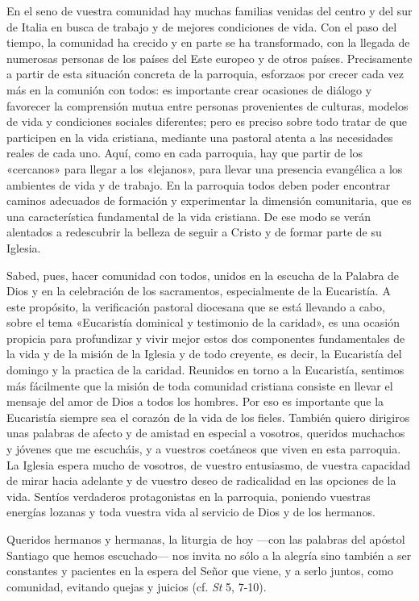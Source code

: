En el seno de vuestra comunidad hay muchas familias venidas del centro y
del sur de Italia en busca de trabajo y de mejores condiciones de vida.
Con el paso del tiempo, la comunidad ha crecido y en parte se ha
transformado, con la llegada de numerosas personas de los países del
Este europeo y de otros países. Precisamente a partir de esta situación
concreta de la parroquia, esforzaos por crecer cada vez más en la
comunión con todos: es importante crear ocasiones de diálogo y favorecer
la comprensión mutua entre personas provenientes de culturas, modelos de
vida y condiciones sociales diferentes; pero es preciso sobre todo
tratar de que participen en la vida cristiana, mediante una pastoral
atenta a las necesidades reales de cada uno. Aquí, como en cada
parroquia, hay que partir de los «cercanos» para llegar a los «lejanos»,
para llevar una presencia evangélica a los ambientes de vida y de
trabajo. En la parroquia todos deben poder encontrar caminos adecuados
de formación y experimentar la dimensión comunitaria, que es una
característica fundamental de la vida cristiana. De ese modo se verán
alentados a redescubrir la belleza de seguir a Cristo y de formar parte
de su Iglesia.

Sabed, pues, hacer comunidad con todos, unidos en la escucha de la
Palabra de Dios y en la celebración de los sacramentos, especialmente de
la Eucaristía. A este propósito, la verificación pastoral diocesana que
se está llevando a cabo, sobre el tema «Eucaristía dominical y
testimonio de la caridad», es una ocasión propicia para profundizar y
vivir mejor estos dos componentes fundamentales de la vida y de la
misión de la Iglesia y de todo creyente, es decir, la Eucaristía del
domingo y la practica de la caridad. Reunidos en torno a la Eucaristía,
sentimos más fácilmente que la misión de toda comunidad cristiana
consiste en llevar el mensaje del amor de Dios a todos los hombres. Por
eso es importante que la Eucaristía siempre sea el corazón de la vida de
los fieles. También quiero dirigiros unas palabras de afecto y de
amistad en especial a vosotros, queridos muchachos y jóvenes que me
escucháis, y a vuestros coetáneos que viven en esta parroquia. La
Iglesia espera mucho de vosotros, de vuestro entusiasmo, de vuestra
capacidad de mirar hacia adelante y de vuestro deseo de radicalidad en
las opciones de la vida. Sentíos verdaderos protagonistas en la
parroquia, poniendo vuestras energías lozanas y toda vuestra vida al
servicio de Dios y de los hermanos.

Queridos hermanos y hermanas, la liturgia de hoy ---con las palabras del
apóstol Santiago que hemos escuchado--- nos invita no sólo a la alegría
sino también a ser constantes y pacientes en la espera del Señor que
viene, y a serlo juntos, como comunidad, evitando quejas y juicios (cf.
\emph{St} 5, 7-10).


